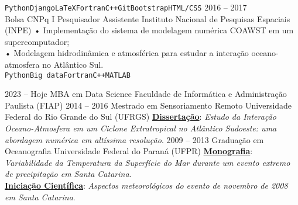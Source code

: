 \documentclass[9pt]{developercv} %
\begin{document}
\begin{entrylist}
{		\texttt{Python}\slashsep\texttt{Django}\slashsep\texttt{LaTeX}\slashsep\texttt{Fortran}\slashsep\texttt{C++}\slashsep\texttt{Git}\slashsep\texttt{Bootstrap}\slashsep\texttt{HTML/CSS}}
	\entry
		{2016 -- 2017\\\footnotesize{Bolsa CNPq I}}
		{Pesquisador Assistente}
		{Instituto Nacional de Pesquisas Espaciais (INPE)}
		{•  Implementação do sistema de modelagem numérica COAWST em um supercomputador; \\
		 • Modelagem hidrodinâmica e atmosférica para estudar a interação oceano-atmosfera no Atlântico Sul. 
		 \\ \texttt{Python}\slashsep\texttt{Big data}\slashsep\texttt{Fortran}\slashsep\texttt{C++}\slashsep\texttt{MATLAB}}
\end{entrylist}

\vspace{-0.5cm}

\begin{entrylist}
	\entry
		{2023 -- Hoje}
		{MBA em Data Science}
		{Faculdade de Informática e Administração Paulista (FIAP)}
		{}
		\entry
		{2014 -- 2016}
		{Mestrado em Sensoriamento Remoto}
		{Universidade Federal do Rio Grande do Sul (UFRGS)}
		{\href{https://lume.ufrgs.br/handle/10183/171223}{\textcolor{bleu_cite}{\textbf{Dissertação}}}: \textit{Estudo da Interação Oceano-Atmosfera em um Ciclone Extratropical no Atlântico Sudoeste: uma abordagem numérica em altíssima resolução}.}
	\entry
		{2009 -- 2013}
		{Graduação em Oceanografia}
		{Universidade Federal do Paraná (UFPR)}
		{\href{http://doi.org/10.13140/RG.2.2.15184.35847}{\textcolor{bleu_cite}{\textbf{Monografia}}}: \textit{Variabilidade da Temperatura da Superfície do Mar durante um evento extremo de precipitação em Santa Catarina}. 
		\\ \href{http://doi.org/10.13140/RG.2.2.25250.68800}{\textcolor{bleu_cite}{\textbf{Iniciação Científica}}}: \textit{Aspectos meteorológicos do evento de novembro de 2008 em Santa Catarina}.
		}
\end{entrylist}

\vspace{-0.4cm}
\end{document}
